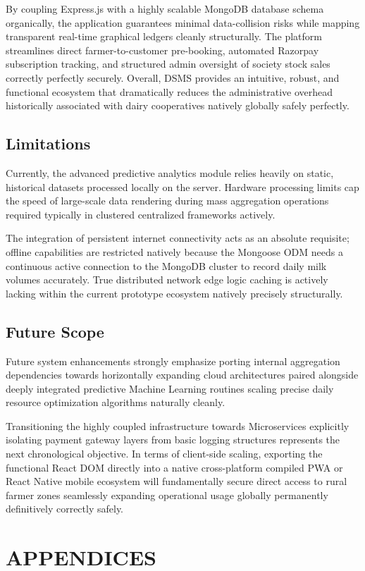 \documentclass[12pt,a4paper]{report}
\begin{document}
By coupling Express.js with a highly scalable MongoDB database schema organically, the application guarantees minimal data-collision risks while mapping transparent real-time graphical ledgers cleanly structurally. The platform streamlines direct farmer-to-customer pre-booking, automated Razorpay subscription tracking, and structured admin oversight of society stock sales correctly perfectly securely. Overall, DSMS provides an intuitive, robust, and functional ecosystem that dramatically reduces the administrative overhead historically associated with dairy cooperatives natively globally safely perfectly.
\section{Limitations}
Currently, the advanced predictive analytics module relies heavily on static, historical datasets processed locally on the server. Hardware processing limits cap the speed of large-scale data rendering during mass aggregation operations required typically in clustered centralized frameworks actively.

The integration of persistent internet connectivity acts as an absolute requisite; offline capabilities are restricted natively because the Mongoose ODM needs a continuous active connection to the MongoDB cluster to record daily milk volumes accurately. True distributed network edge logic caching is actively lacking within the current prototype ecosystem natively precisely structurally.
\section{Future Scope}
Future system enhancements strongly emphasize porting internal aggregation dependencies towards horizontally expanding cloud architectures paired alongside deeply integrated predictive Machine Learning routines scaling precise daily resource optimization algorithms naturally cleanly.

Transitioning the highly coupled infrastructure towards Microservices explicitly isolating payment gateway layers from basic logging structures represents the next chronological objective. In terms of client-side scaling, exporting the functional React DOM directly into a native cross-platform compiled PWA or React Native mobile ecosystem will fundamentally secure direct access to rural farmer zones seamlessly expanding operational usage globally permanently definitively correctly safely.

\chapter{APPENDICES}
\end{document}
